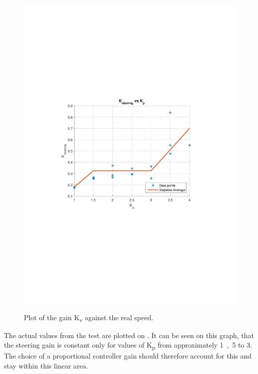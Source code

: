 \begin{figure}[H]
  \centering
  {
    \includegraphics[width=1.2\textwidth]{figures/KvVsKp.pdf}
  }
  \caption{Plot of the gain \si{K_v} against the real speed.}
  \label{fig:steeringPlotKsteeringVsKp}
\end{figure}
%
The actual values from the test are plotted on . It can be seen on this graph, that the steering gain is constant only for values of \si{K_p} from approximately \si{1,5} to \si{3}. The choice of a proportional controller gain should therefore account for this and stay within this linear area.